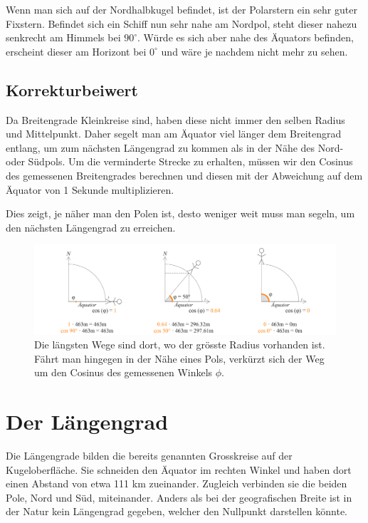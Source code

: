 \begin{refsection}
Wenn man sich auf der Nordhalbkugel befindet, ist der Polarstern ein sehr guter Fixstern. Befindet sich ein Schiff nun sehr nahe am Nordpol, steht dieser nahezu senkrecht am Himmels bei $90^{\circ}$. Würde es sich aber nahe des Äquators befinden, erscheint dieser am Horizont bei $0^{\circ}$ und wäre je nachdem nicht mehr zu sehen.


\subsection{Korrekturbeiwert}
Da Breitengrade Kleinkreise sind, haben diese nicht immer den selben Radius und Mittelpunkt. Daher segelt man am Äquator viel länger dem Breitengrad entlang, um zum nächsten Längengrad zu kommen als in der Nähe des Nord- oder Südpols.
Um die verminderte Strecke zu erhalten, müssen wir den Cosinus des gemessenen Breitengrades berechnen und diesen mit der Abweichung auf dem Äquator von 1 Sekunde multiplizieren.

Dies zeigt, je näher man den Polen ist, desto weniger weit muss man segeln, um den nächsten Längengrad zu erreichen.

\begin{figure}[htbp]
\centering
\includegraphics[width=1\textwidth]{kugel/Korrekturbeiwert.jpg}
\caption{Die längsten Wege sind dort, wo der grösste Radius vorhanden ist. Fährt man hingegen in der Nähe eines Pols, verkürzt sich der Weg um den Cosinus des gemessenen Winkels $\phi$.}
\end{figure}

\section{Der Längengrad}
Die Längengrade bilden die bereits genannten Grosskreise auf der Kugeloberfläche.
Sie schneiden den Äquator im rechten Winkel und haben dort einen Abstand von etwa 111 km zueinander. Zugleich verbinden sie die beiden Pole, Nord und Süd, miteinander. Anders als bei der geografischen Breite ist in der Natur kein Längengrad gegeben, welcher den Nullpunkt darstellen könnte.


\end{refsection}
